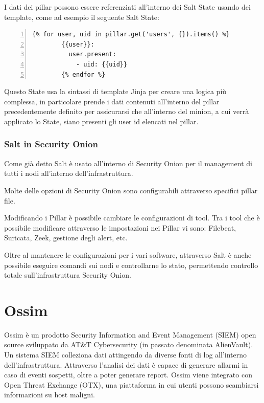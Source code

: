 I dati dei pillar possono essere referenziati all'interno dei Salt State usando dei template, come ad esempio il seguente Salt State:
    \begin{Verbatim}[numbers=left, frame=single, fontsize=\small]
        {% for user, uid in pillar.get('users', {}).items() %}
        {{user}}:
          user.present:
            - uid: {{uid}}
        {% endfor %}
    \end{Verbatim}
Questo State usa la sintassi di template Jinja per creare una logica più complessa, in particolare prende i dati contenuti all'interno del pillar precedentemente definito per assicurarsi che all'interno del minion, a cui verrà applicato lo State, siano presenti gli user id elencati nel pillar.

\subsubsection{Salt in Security Onion}
Come già detto Salt è usato all'interno di Security Onion per il management di tutti i nodi all'interno dell'infrastruttura.

Molte delle opzioni di Security Onion sono configurabili attraverso specifici pillar file.

Modificando i Pillar è possibile cambiare le configurazioni di tool. Tra i tool che è possibile modificare attraverso le impostazioni nei Pillar vi sono: Filebeat, Suricata, Zeek, gestione degli alert, etc.


Oltre al mantenere le configurazioni per i vari software, attraverso Salt è anche possibile eseguire comandi sui nodi e controllarne lo stato, permettendo controllo totale sull'infrastruttura Security Onion.


\section{Ossim}
Ossim \cite{ossim} è un prodotto Security Information and Event Management (SIEM)  open source sviluppato da AT\&T Cybersecurity (in passato denominata AlienVault). Un sistema SIEM colleziona dati attingendo da diverse fonti di log all'interno dell'infrastruttura. 
Attraverso l'analisi dei dati è capace di generare allarmi in caso di eventi sospetti, oltre a poter generare report.
Ossim viene integrato con Open Threat Exchange (OTX), una piattaforma in cui utenti possono scambiarsi informazioni su host maligni.

